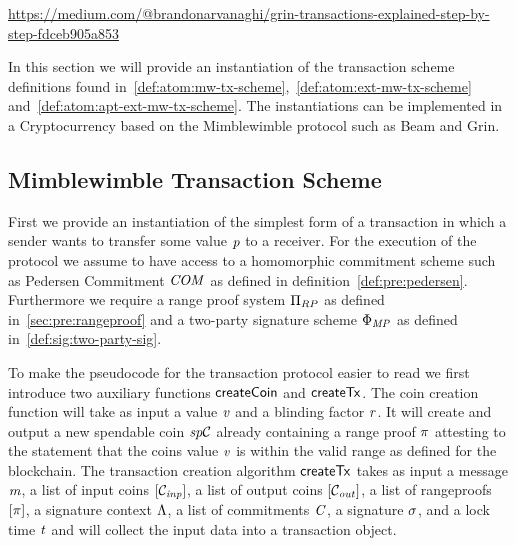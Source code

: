 \urldef\urlgrinexplained\url{https://medium.com/@brandonarvanaghi/grin-transactions-explained-step-by-step-fdceb905a853}

In this section we will provide an instantiation of the transaction scheme definitions found in~\cref{def:atom:mw-tx-scheme},~\cref{def:atom:ext-mw-tx-scheme} and~\cref{def:atom:apt-ext-mw-tx-scheme}.
The instantiations can be implemented in a Cryptocurrency based on the Mimblewimble protocol such as Beam and Grin.

\subsection{Mimblewimble Transaction Scheme}\label{subsec:atom:mw-tx-scheme}

First we provide an instantiation of the simplest form of a transaction in which a sender wants to transfer some value $\mathit{p}$ to a receiver.
For the execution of the protocol we assume to have access to a homomorphic commitment scheme such as Pedersen Commitment $\mathit{COM}$ as defined in definition~\cref{def:pre:pedersen}.
Furthermore we require a range proof system $\Pi_{RP}$ as defined in~\cref{sec:pre:rangeproof} and a two-party signature scheme $\Phi_{\mathit{MP}}$ as defined in~\cref{def:sig:two-party-sig}.

To make the pseudocode for the transaction protocol easier to read we first introduce two auxiliary functions $\mathsf{createCoin}$
and $\mathsf{createTx}$.
The coin creation function will take as input a value $\mathit{v}$ and a blinding factor $\mathit{r}$. It will create and output a new spendable coin $\mathit{sp}\mathcal{C}$ already containing a range proof $\pi$ attesting to the statement that the coins value $\mathit{v}$ is within the valid range as defined for the blockchain.
The transaction creation algorithm $\mathsf{createTx}$ takes as input a message $\mathit{m}$, a list of input coins $[\mathcal{C}_{\mathit{inp}}]$, a list of output coins $[\mathcal{C}_{\mathit{out}}]$, a list of rangeproofs $[\pi]$, a signature context $\Lambda$, a list of commitments $\mathit{C}$, a signature $\sigma$, and a lock time $\mathit{t}$ and will collect the input data into a transaction object.

